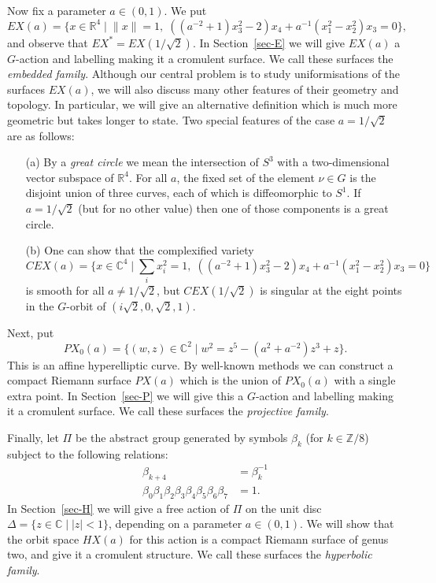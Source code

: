 \documentclass[reqno]{amsart}
\newcommand{\Dl}        {\Delta}
\newcommand{\bt}        {\beta}
\newcommand{\Z}         {{\mathbb{Z}}}
\newcommand{\R}         {{\mathbb{R}}}
\newcommand{\C}         {{\mathbb{C}}}
\newcommand{\st}        {\;|\;}
\newcommand{\rt}        {\sqrt{2}}
\renewcommand{\:}{\colon}
\theoremstyle{definition}
\begin{document}
Now fix a parameter $a\in (0,1)$.  We put
\[ EX(a) = \{x\in\R^4\st \|x\|=1,\;
              ((a^{-2}+1)x_3^2-2)x_4+a^{-1}(x_1^2-x_2^2)x_3=0\},
\]
and observe that $EX^*=EX(1/\rt)$.  In Section~\ref{sec-E} we
will give $EX(a)$ a $G$-action and labelling making it a cromulent
surface.  We call these surfaces the \emph{embedded family}.  Although
our central problem is to study uniformisations of the surfaces
$EX(a)$, we will also discuss many other features of their geometry
and topology.  In particular, we will give an alternative definition
which is much more geometric but takes longer to state.  Two special
features of the case $a=1/\rt$ are as follows:
\begin{itemize}
 \item[(a)] By a \emph{great circle} we mean the intersection of $S^3$
  with a two-dimensional vector subspace of $\R^4$.  For all $a$, the
  fixed set of the element $\nu\in G$ is the disjoint union of three
  curves, each of which is diffeomorphic to $S^1$.  If
  $a=1/\rt$ (but for no other value) then one of those components
  is a great circle.
 \item[(b)] One can show that the complexified variety
  \[ CEX(a) = \{x\in\C^4\st \sum_ix_i^2=1,\;
               ((a^{-2}+1)x_3^2-2)x_4+a^{-1}(x_1^2-x_2^2)x_3=0\}
  \]
  is smooth for all $a\neq 1/\rt$, but $CEX(1/\rt)$ is
  singular at the eight points in the $G$-orbit of
  $(i\rt,0,\rt,1)$.
\end{itemize}

Next, put
\[ PX_0(a) = \{(w,z)\in\C^2\st w^2=z^5-(a^2+a^{-2})z^3+z\}. \]
This is an affine hyperelliptic curve.  By well-known methods we can
construct a compact Riemann surface $PX(a)$ which is the union of
$PX_0(a)$ with a single extra point.  In
Section~\ref{sec-P} we will give this a $G$-action and
labelling making it a cromulent surface.  We call these surfaces the
\emph{projective family}.

Finally, let $\Pi$ be the abstract group generated by symbols $\bt_k$
(for $k\in\Z/8$) subject to the following relations:
\begin{align*}
 \bt_{k+4} &= \bt_k^{-1} \\
 \bt_0\bt_1\bt_2\bt_3\bt_4\bt_5\bt_6\bt_7 &= 1.
\end{align*}
In Section~\ref{sec-H} we will give a free action of $\Pi$ on
the unit disc $\Dl=\{z\in\C\st |z|<1\}$, depending on a parameter
$a\in(0,1)$.  We will show that the orbit space $HX(a)$ for this
action is a compact Riemann surface of genus two, and give it a
cromulent structure.  We call these surfaces the \emph{hyperbolic family}.
\end{document}
